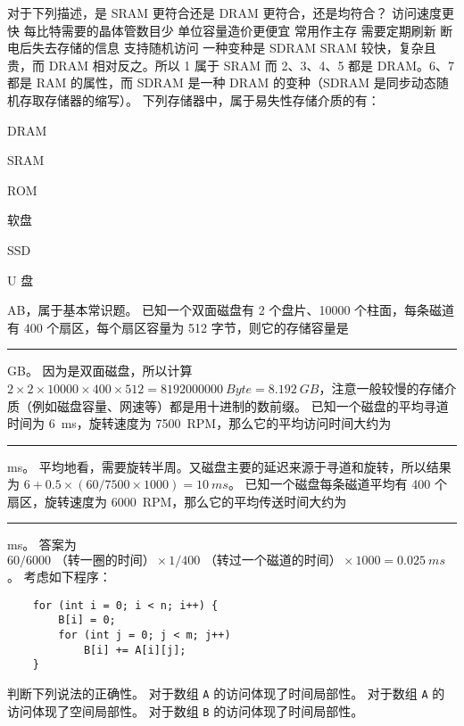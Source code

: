     \begin{problems}
        \pro 对于下列描述，是 SRAM 更符合还是 DRAM 更符合，还是均符合？
            \qn 访问速度更快
            \qn 每比特需要的晶体管数目少
            \qn 单位容量造价更便宜
            \qn 常用作主存
            \qn 需要定期刷新
            \qn 断电后失去存储的信息
            \qn 支持随机访问
            \qn 一种变种是 SDRAM
        \sol SRAM 较快，复杂且贵，而 DRAM 相对反之。所以 1 属于 SRAM 而 2、3、4、5 都是 DRAM。6、7 都是 RAM 的属性，而 SDRAM 是一种 DRAM 的变种（SDRAM 是同步动态随机存取存储器的缩写）。
        \pro 下列存储器中，属于易失性存储介质的有：
            \begin{choices}
                \item DRAM
                \item SRAM
                \item ROM
                \item 软盘
                \item SSD
                \item U 盘
            \end{choices}
        \sol AB，属于基本常识题。
        \pro 已知一个双面磁盘有 2 个盘片、10000 个柱面，每条磁道有 400 个扇区，每个扇区容量为 512 字节，则它的存储容量是 \rule{2.5cm}{0.25mm} GB。
        \sol 因为是双面磁盘，所以计算 $2 \times 2 \times 10000 \times 400 \times 512 = \SI{8192000000}{Byte} = \SI{8.192}{GB}$，注意一般较慢的存储介质（例如磁盘容量、网速等）都是用十进制的数前缀。
        \pro 已知一个磁盘的平均寻道时间为 \SI{6}{ms}，旋转速度为 \SI{7500}{RPM}，那么它的平均访问时间大约为 \rule{2.5cm}{0.25mm} ms。
        \sol 平均地看，需要旋转半周。又磁盘主要的延迟来源于寻道和旋转，所以结果为 $6 + 0.5 \times (60/7500 \times 1000) = \SI{10}{ms}$。
        \pro 已知一个磁盘每条磁道平均有 400 个扇区，旋转速度为 \SI{6000}{RPM}，那么它的平均传送时间大约为 \rule{2.5cm}{0.25mm} ms。
        \sol 答案为 $60/6000 \text{ （转一圈的时间）} \times 1/400 \text{ （转过一个磁道的时间）} \times 1000 = \SI{0.025}{ms}$。
        \pro 考虑如下程序：
        \begin{verbatim}
    for (int i = 0; i < n; i++) {
        B[i] = 0;
        for (int j = 0; j < m; j++)
            B[i] += A[i][j];
    }
        \end{verbatim}
        判断下列说法的正确性。
            \qn 对于数组 \verb|A| 的访问体现了时间局部性。
            \qn 对于数组 \verb|A| 的访问体现了空间局部性。
            \qn 对于数组 \verb|B| 的访问体现了时间局部性。

\end{problems}
